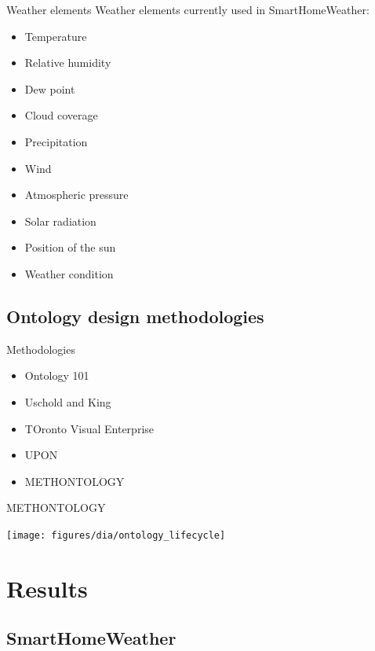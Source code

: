 \documentclass{beamer}
\begin{document}
\begin{frame}{Weather elements}
	Weather elements currently used in SmartHomeWeather:
	\begin{itemize}
		\item Temperature
		\item Relative humidity
		\item Dew point
		\item Cloud coverage
		\item Precipitation
		\item Wind
		\item Atmospheric pressure
		\item Solar radiation
		\item Position of the sun
		\item Weather condition
	\end{itemize}
\end{frame}

\subsection{Ontology design methodologies}

\begin{frame}{Methodologies}
	\begin{itemize}
		\item Ontology 101
		\item Uschold and King
		\item TOronto Visual Enterprise
		\item UPON
		\item METHONTOLOGY
	\end{itemize}
\end{frame}

\begin{frame}{METHONTOLOGY}
	\begin{center}
		\texttt{[image: figures/dia/ontology\_lifecycle]}
	\end{center}
\end{frame}

\section{Results}

\subsection{SmartHomeWeather}
\end{document}
